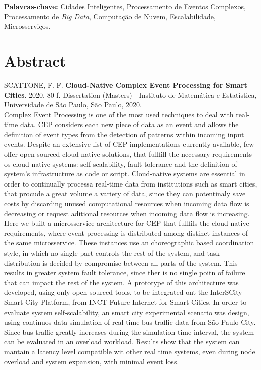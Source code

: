 \documentclass[11pt,twoside,a4paper]{book}
\begin{document}
 
 \noindent \textbf{Palavras-chave:} Cidades Inteligentes, Processamento de Eventos Complexos, Processamento de \emph{Big Data}, Computação de Nuvem, Escalabilidade, Microsserviços.

\chapter*{Abstract}
\noindent SCATTONE, F. F. \textbf{Cloud-Native Complex Event Processing for Smart Cities}. 
2020. 80 f.
Dissertation (Masters) - Instituto de Matemática e Estatística,
Universidade de São Paulo, São Paulo, 2020.
\\

Complex Event Processing is one of the most used techniques to deal with real-time data. CEP considers each new piece of data as an event and allows the definition of event types from the detection of patterns within incoming input events. Despite an extensive list of CEP implementations currently available, few offer open-sourced cloud-native solutions, that fullfill the necessary requirements os cloud-native systems: self-scalability, fault tolerance and the definition of system's infrastructure as code or script. Cloud-native systems are essential in order to continually processa real-time data from institutions such as smart cities, that procude a great volume a variety of data, since they can potentinaly save costs by discarding unused computational resources when incoming data flow is decreasing or request aditional resources when incoming data flow is increasing. Here we built a microsservice architecture for CEP that fullfils the cloud native requirements, where event processing is distributed among distinct instances of the same microsservice. These instances use an choreographic based coordination style, in which no single part controls the rest of the system, and task distribution is decided by compromise between all parts of the system. This results in greater system fault tolerance, since ther is no single poitn of failure that can impact the rest of the system. A prototype of this architecture
was developed, using only open-sourced tools, to be integrated ont the InterSCity Smart City Platform, from INCT Future Internet for Smart Cities. In order to evaluate system self-scalability, an smart city experimental scenario was design, using continuos data simulation of real time bus traffic data from São Paulo City. Since bus traffic greatly increases during the simulation time interval, the system can be evaluated in an overload workload. Results show that the system can mantain a latency level compatible wit other real time systems, even during node overload and system expansion, with minimal event loss.\\
\end{document}
